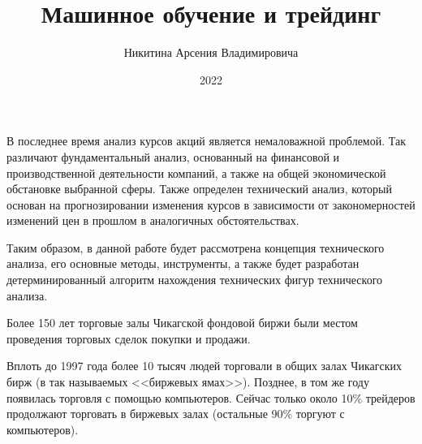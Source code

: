 \documentclass[bachelor, och, coursework]{SCWorks}
\begin{document}

\title{Машинное обучение и трейдинг}






\author{Никитина Арсения Владимировича}



\date{2022}

\maketitle



\tableofcontents

\intro
        В последнее время анализ курсов акций является немаловажной проблемой.
        Так различают фундаментальный анализ, основанный на финансовой и
        производственной деятельности компаний, а также на общей экономической
        обстановке выбранной сферы. Также определен технический анализ, который
        основан на прогнозировании изменения курсов в зависимости от
        закономерностей изменений цен в прошлом в аналогичных обстоятельствах.

    Таким образом, в данной работе будет рассмотрена концепция технического
    анализа, его основные методы, инструменты, а также будет разработан
    детерминированный алгоритм нахождения технических фигур технического
    анализа.
    
    Более 150 лет торговые залы Чикагской фондовой биржи были местом проведения
    торговых сделок покупки и продажи.

    Вплоть до 1997 года более 10 тысяч людей торговали в общих залах Чикагских
    бирж (в так называемых <<биржевых ямах>>). Позднее, в том же году появилась
    торговля с помощью компьютеров. Сейчас только около 10\% трейдеров
    продолжают торговать в биржевых залах (остальные 90\% торгуют с
    компьютеров).
\end{document}
